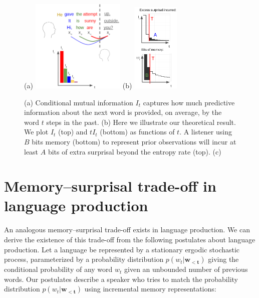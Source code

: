 \begin{figure}
	(a)
\includegraphics[width=0.4\textwidth]{figures-gdrive/mi-distance.png}
	(b)
\includegraphics[width=0.2\textwidth]{figures-gdrive/theorem.png}
	\caption{
		(a) Conditional mutual information $I_t$ captures how much predictive information about the next word is provided, on average, by the word $t$ steps in the past.
		(b) Here we illustrate our theoretical result. We plot $I_t$ (top) and $tI_t$ (bottom) as functions of $t$. A listener using $B$ bits memory (bottom) to represent prior observations will incur at least $A$ bits of extra surprisal beyond the entropy rate (top). 
		(c)  
}\label{fig:theorem}
\end{figure}



\section{Memory--surprisal trade-off in language production}

An analogous memory--surprisal trade-off exists in language production. We can derive the existence of this trade-off from the following postulates about language production. Let a language be represented by a stationary ergodic stochastic process, parameterized by a probability distribution $p(w_t | \mathbf{w_{<t}})$ giving the conditional probability of any word $w_t$ given an unbounded number of previous words. Our postulates describe a speaker who tries to match the probability distribution $p(w_t | \mathbf{w_{<t}})$ using incremental memory representations:

